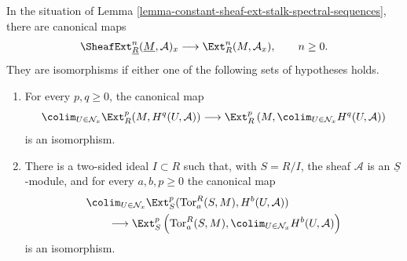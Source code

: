 \begin{lemma}
\label{lemma-constant-sheaf-ext-stalk-comparison}
\begin{reference}
\cite[Chapter IV, \S 4.3, Remark 2, p. 193]{Tohoku}
\end{reference}
In the situation of
Lemma \ref{lemma-constant-sheaf-ext-stalk-spectral-sequences}, there are
canonical maps
\begin{equation}
\label{equation-constant-sheaf-ext-stalk-comparison}
\SheafExt^n_{\underline{R}}(\underline{M}, \mathcal{A})_x
\longrightarrow \Ext_R^n(M, \mathcal{A}_x),
\qquad n \geq 0.
\end{equation}
They are isomorphisms if either one of the following sets of hypotheses
holds.
\begin{enumerate}
\item For every $p, q \geq 0$, the canonical map
$$
\colim_{U \in \mathcal{N}_x}
\Ext_R^p(M, H^q(U, \mathcal{A}))
\longrightarrow
\Ext_R^p\left(M,
\colim_{U \in \mathcal{N}_x}H^q(U, \mathcal{A})\right)
$$
is an isomorphism.
\item There is a two-sided ideal $I \subset R$ such that, with $S = R/I$,
the sheaf $\mathcal{A}$ is an $\underline{S}$-module, and for every
$a, b, p \geq 0$ the canonical map
$$
\begin{aligned}
&
\colim_{U \in \mathcal{N}_x}
\Ext_S^p(\text{Tor}_a^R(S, M), H^b(U, \mathcal{A}))
\\
&\qquad\longrightarrow
\Ext_S^p\left(\text{Tor}_a^R(S, M),
\colim_{U \in \mathcal{N}_x}H^b(U, \mathcal{A})\right)
\end{aligned}
$$
is an isomorphism.
\end{enumerate}
\end{lemma}

